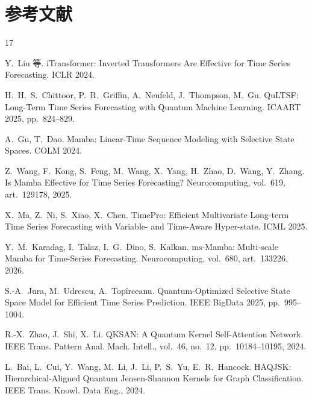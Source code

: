 
\section*{参考文献}

\begin{thebibliography}{17}

 Y.~Liu 等. iTransformer: Inverted Transformers Are Effective for Time Series Forecasting. ICLR 2024.

 H.~H.~S.~Chittoor, P.~R.~Griffin, A.~Neufeld, J.~Thompson, M.~Gu. QuLTSF: Long-Term Time Series Forecasting with Quantum Machine Learning. ICAART 2025, pp.~824--829.

 A.~Gu, T.~Dao. Mamba: Linear-Time Sequence Modeling with Selective State Spaces. COLM 2024.

 Z.~Wang, F.~Kong, S.~Feng, M.~Wang, X.~Yang, H.~Zhao, D.~Wang, Y.~Zhang. Is Mamba Effective for Time Series Forecasting? Neurocomputing, vol.~619, art.~129178, 2025.

 X.~Ma, Z.~Ni, S.~Xiao, X.~Chen. TimePro: Efficient Multivariate Long-term Time Series Forecasting with Variable- and Time-Aware Hyper-state. ICML 2025.

 Y.~M.~Karadag, I.~Talaz, I.~G.~Dino, S.~Kalkan. ms-Mamba: Multi-scale Mamba for Time-Series Forecasting. Neurocomputing, vol.~680, art.~133226, 2026.

 S.-A.~Jura, M.~Udrescu, A.~Top\^{i}rceanu. Quantum-Optimized Selective State Space Model for Efficient Time Series Prediction. IEEE BigData 2025, pp.~995--1004.

 R.-X.~Zhao, J.~Shi, X.~Li. QKSAN: A Quantum Kernel Self-Attention Network. IEEE Trans. Pattern Anal. Mach. Intell., vol.~46, no.~12, pp.~10184--10195, 2024.

 L.~Bai, L.~Cui, Y.~Wang, M.~Li, J.~Li, P.~S.~Yu, E.~R.~Hancock. HAQJSK: Hierarchical-Aligned Quantum Jensen-Shannon Kernels for Graph Classification. IEEE Trans. Knowl. Data Eng., 2024.


\end{thebibliography}
